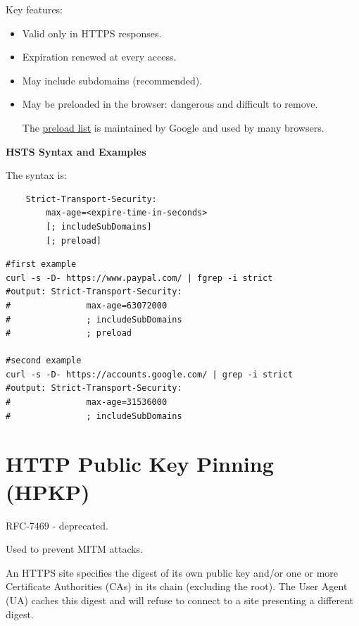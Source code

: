 \vspace{0.2cm}

\noindent Key features:
\begin{itemize}
    \item Valid only in HTTPS responses.
    \item Expiration renewed at every access.
    \item May include subdomains (recommended).
    \item May be preloaded in the browser: dangerous and difficult to remove. 
    
    The \href{https://hstspreload.org/}{preload list} is maintained by Google and used by many browsers.
\end{itemize}

\begin{center}
    \textbf{HSTS Syntax and Examples}
\end{center}

The syntax is:
\begin{verbatim}
    Strict-Transport-Security:
        max-age=<expire-time-in-seconds>
        [; includeSubDomains]
        [; preload]
\end{verbatim}

\begin{lstlisting}[style=bashStyle]
#first example
curl -s -D- https://www.paypal.com/ | fgrep -i strict
#output: Strict-Transport-Security: 
#               max-age=63072000 
#               ; includeSubDomains
#               ; preload

#second example
curl -s -D- https://accounts.google.com/ | grep -i strict
#output: Strict-Transport-Security:
#               max-age=31536000
#               ; includeSubDomains
\end{lstlisting}

\clearpage

\section{HTTP Public Key Pinning (HPKP)}
\begin{center}
    RFC-7469 - deprecated.

    Used to prevent MITM attacks.
\end{center}
An HTTPS site specifies the digest of its own public key and/or one or more Certificate Authorities (CAs) in its chain (excluding the root). The User Agent (UA) caches this digest and will refuse to connect to a site presenting a different digest.

